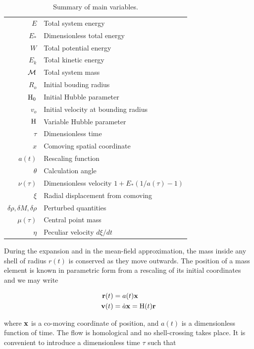 \begin{table}
\begin{center}
\caption{Summary of main variables.}
\label{Tab:identities}
\begin{tabularx}{0.7\textwidth}{rl}
\hline
$E$ & Total system energy \\
$E_*$ & Dimensionless total energy \\
$W$ & Total potential energy \\
$E_k$ & Total kinetic energy\\
$\cal M$ & Total system mass\\
$R_o$ & Initial bouding radius\\
${\textrm{H}}_0$ & Initial Hubble parameter\\
$v_o$ & Initial velocity at bounding radius\\
${\textrm{H}}$ & Variable Hubble parameter\\
$\tau$ & Dimensionless time\\
$x$ & Comoving spatial coordinate\\
$a(t)$ & Rescaling function\\
$\theta$ & Calculation angle\\
$\nu(\tau)$ & Dimensionless velocity $1 + E_*(1/a(\tau)-1)$\\
$\xi$ & Radial displacement from comoving \\
$\delta\rho,\delta M,\delta\rho$ & Perturbed quantities\\
$\mu(\tau)$ & Central point mass\\
$\eta$ & Peculiar velocity $d\xi/dt$\\
\hline
\end{tabularx}
\end{center}
\end{table}

During the expansion and in the mean-field approximation, the mass inside any shell of radius $r(t)$ is conserved as they move outwards. The position of a mass element is known in parametric form from a rescaling of its initial coordinates and we may write 

\begin{align} 
\bold{r}(t) &= a(t)\bold{x}\\
\bold{v}(t) &= \dot{a}\bold{x} = {\textrm{H}}(t)\bold{r} 
\end{align} 

 where $\bold{x}$ is a co-moving coordinate of position, and $a(t)$ is a dimensionless function of time. The flow is homological and no shell-crossing takes place. It is convenient to introduce a dimensionless time $\tau$ such that 
 
